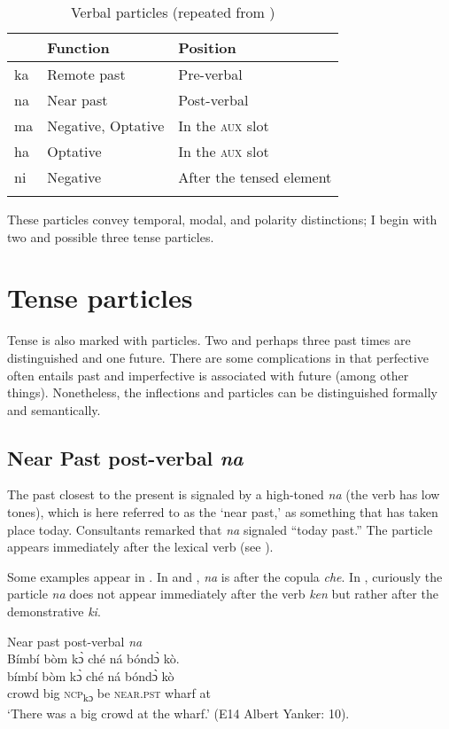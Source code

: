 \begin{table}
\caption{\label{tab:verbmorph:30}Verbal particles (repeated from )}


\begin{tabular}{lll} 
\lsptoprule
& Function & Position\\
\midrule
ka & Remote past & Pre-verbal\\
 na & Near past & Post-verbal\\
 ma & Negative, Optative & In the \textsc{aux} slot\\
ha & Optative & In the \textsc{aux} slot\\
 ni & Negative & After the tensed element\\
\lspbottomrule
\end{tabular}
\end{table}

These particles convey temporal, modal, and polarity distinctions; I begin with two and possible three tense particles.

\section{Tense particles}\label{sec:4.3}
\hypertarget{Toc115517784}{}
Tense is also marked with particles. Two and perhaps three past times are distinguished and one future. There are some complications in that perfective often entails past and imperfective is associated with future (among other things). Nonetheless, the inflections and particles can be distinguished formally and semantically.

\subsection{Near Past post-verbal \textit{na}}
\label{sec:4.3.1}
The past closest to the present is signaled by a high-toned \textit{na} (the verb has low tones), which is here referred to as the ‘near past,' as something that has taken place today. Consultants remarked that \textit{na} signaled “today past.” The particle appears immediately after the lexical verb (see ).

Some examples appear in . In  and , \textit{na} is after the copula \textit{che}. In , curiously the particle \textit{na} does not appear immediately after the verb \textit{ken} but rather after the demonstrative \textit{ki}.

\ea%
    \label{ex:121}
    Near past post-verbal \textit{na}\\
    \ea \label{ex:121a} Bímbí bòm kɔ̀ ché ná bóndɔ̀ kò.\\
    \gll bímbí    bòm  kɔ̀      ché  ná        bóndɔ̀  kò\\
    crowd  big  \textsc{ncp}\textsubscript{kɔ}    be    \textsc{near.pst}  wharf    at\\
    \glt ‘There was a big crowd at the wharf.' (E14 Albert Yanker: 10).

